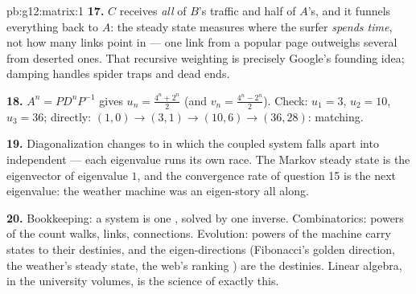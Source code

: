 \begin{solution}{pb:g12:matrix:1}
\textbf{17.} $C$ receives \emph{all} of $B$'s traffic and half
of $A$'s, and it funnels everything back to $A$: the steady
state measures where the surfer \emph{spends time}, not how
many links point in --- one link from a popular page outweighs
several from deserted ones. That recursive weighting is
precisely Google's founding idea; damping handles spider traps
and dead ends.

\textbf{18.} $A^n = P D^n P^{-1}$ gives
$u_n = \frac{4^n + 2^n}{2}$ (and
$v_n = \frac{4^n - 2^n}{2}$). Check: $u_1 = 3$, $u_2 = 10$,
$u_3 = 36$; directly: $(1,0) \to (3,1) \to (10,6) \to
(36, 28)$: matching.

\textbf{19.} Diagonalization changes to  in which
the coupled system falls apart into independent  --- each eigenvalue runs its own race. The Markov
steady state is the eigenvector of eigenvalue $1$, and the
convergence rate of question 15 is the next eigenvalue: the
weather machine was an eigen-story all along.

\textbf{20.} Bookkeeping: a system is one  ,
solved by one inverse. Combinatorics: powers of the  count walks, links, connections. Evolution: powers of
the machine carry states to their destinies, and the
eigen-directions (Fibonacci's golden direction, the weather's
steady state, the web's ranking ) are the destinies.
Linear algebra, in the university volumes, is the science of
exactly this.
\end{solution}

